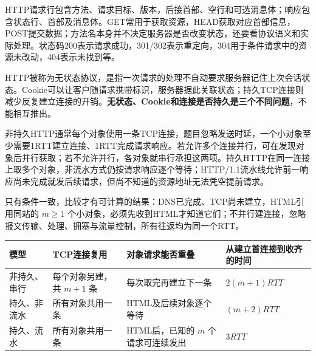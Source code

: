 HTTP请求行包含方法、请求目标、版本，后接首部、空行和可选消息体；响应包含状态行、首部及消息体。GET常用于获取资源，HEAD获取对应首部信息，POST提交数据；方法名本身并不决定服务器是否改变状态，还要看协议语义和实际处理。状态码200表示请求成功，301/302表示重定向，304用于条件请求中的资源未改动，404表示未找到等。

HTTP被称为无状态协议，是指一次请求的处理不自动要求服务器记住上次会话状态。Cookie可以让客户随请求携带标识，服务器据此关联状态；持久TCP连接则减少反复建立连接的开销。\textbf{无状态、Cookie和连接是否持久是三个不同问题}，不能相互推出。

非持久HTTP通常每个对象使用一条TCP连接，题目忽略发送时延，一个小对象至少需要1RTT建立连接、1RTT完成请求响应。若允许多个连接并行，可在发现对象后并行获取；若不允许并行，各对象就串行承担这两项。持久HTTP在同一连接上取多个对象，非流水方式仍按请求响应逐个等待；HTTP/1.1流水线允许前一响应尚未完成就发后续请求，但尚不知道的资源地址无法凭空提前请求。

只有条件一致，比较才有可计算的结果：DNS已完成、TCP尚未建立，HTML引用同站的 \(m\ge1\) 个小对象，必须先收到HTML才知道它们；不并行建连接，忽略报文传输、处理、拥塞与流量控制，所有往返均为同一个RTT。

\begin{wideblock}

\par\medskip\noindent\begin{minipage}{\linewidth}\fontsize{9.3}{12}\selectfont\begin{tabularx}{\linewidth}{@{}YYYY@{}}
\toprule\noalign{}
\begin{minipage}[b]{\linewidth}\raggedright
模型
\end{minipage} & \begin{minipage}[b]{\linewidth}\raggedright
TCP连接复用
\end{minipage} & \begin{minipage}[b]{\linewidth}\raggedright
对象请求能否重叠
\end{minipage} & \begin{minipage}[b]{\linewidth}\raggedright
从建立首连接到收齐的时间
\end{minipage} \\
\midrule\noalign{}


非持久、串行 & 每个对象另建，共 \(m+1\) 条 & 每次取完再建立下一条 & \(2(m+1)RTT\) \\
持久、非流水 & 所有对象共用一条 & HTML及后续对象逐个等待 & \((m+2)RTT\) \\
持久、流水 & 所有对象共用一条 & HTML后，已知的 \(m\) 个请求可连续发出 & \(3RTT\) \\
\bottomrule\end{tabularx}
\end{minipage}\par\medskip

\end{wideblock}

